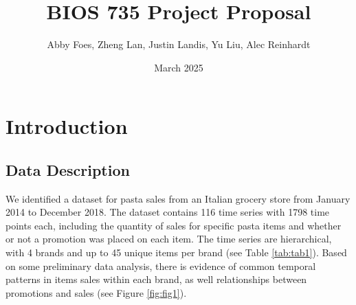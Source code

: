 \documentclass{article}
\title{BIOS 735 Project Proposal}
\author{Abby Foes, Zheng Lan, Justin Landis, Yu Liu, Alec Reinhardt}
\date{March 2025}
\begin{document}
\maketitle

\section{Introduction}

\subsection*{Data Description}

\noindent We identified a dataset for pasta sales from an Italian grocery store from January 2014 to December 2018. The dataset contains 116 time series with 1798 time points each, including the quantity of sales for specific pasta items and whether or not a promotion was placed on each item. The time series are hierarchical, with 4 brands and up to 45 unique items per brand (see Table \ref{tab:tab1}). Based on some preliminary data analysis, there is evidence of common temporal patterns in items sales within each brand, as well relationships between promotions and sales (see Figure \ref{fig:fig1}).

\vspace{1cm}
\end{document}
